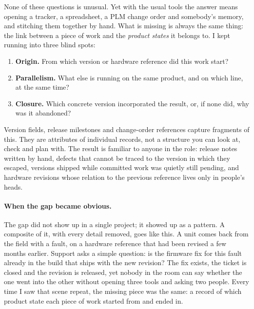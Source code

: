 None of these questions is unusual. Yet with the usual tools the answer
means opening a tracker, a spreadsheet, a PLM change order and somebody's
memory, and stitching them together by hand. What is missing is always the
same thing: the link between a piece of work and the \emph{product states}
it belongs to. I kept running into three blind spots:
\begin{enumerate}[label=(\roman*),leftmargin=2.2em,itemsep=1pt,topsep=3pt]
  \item \textbf{Origin.} From which version or hardware reference did this
        work start?
  \item \textbf{Parallelism.} What else is running on the same product, and
        on which line, at the same time?
  \item \textbf{Closure.} Which concrete version incorporated the result,
        or, if none did, why was it abandoned?
\end{enumerate}
Version fields, release milestones and change-order references capture
fragments of this. They are attributes of individual records, not a
structure you can look at, check and plan with. The result is familiar to
anyone in the role: release notes written by hand, defects that cannot be
traced to the version in which they escaped, versions shipped while
committed work was quietly still pending, and hardware revisions whose
relation to the previous reference lives only in people's heads.

\paragraph{When the gap became obvious.}
The gap did not show up in a single project; it showed up as a pattern.
A composite of it, with every detail removed, goes like this. A unit comes
back from the field with a fault, on a hardware reference that had been
revised a few months earlier. Support asks a simple question: is the
firmware fix for this fault already in the build that ships with the new
revision? The fix exists, the ticket is closed and the revision is
released, yet nobody in the room can say whether the one went into the
other without opening three tools and asking two people. Every time I saw
that scene repeat, the missing piece was the same: a record of which
product state each piece of work started from and ended in.

